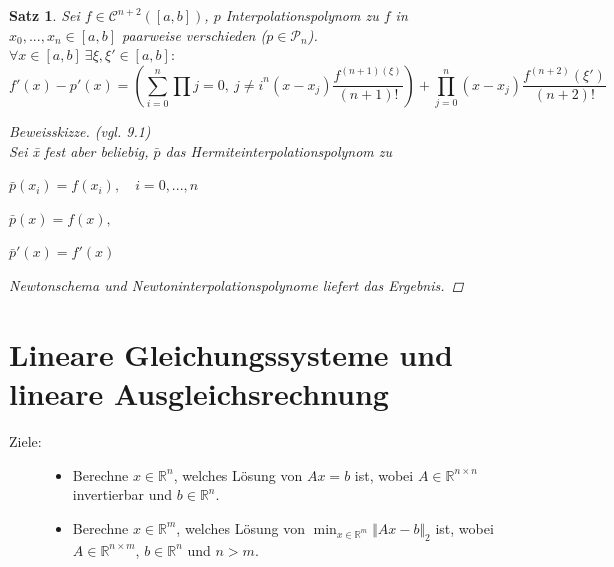 \documentclass[12pt]{article}
\theoremstyle{break}
\newtheorem{theorem}{Satz}[subsection]
\begin{document}
\begin{theorem}
Sei $f \in \mathcal{C}^{n+2}([a,b])$, $p$ Interpolationspolynom zu $f$ in $x_0,..., x_n \in [a,b]$ paarweise verschieden ($p\in \mathcal{P}_n$). \\
$\forall x \in [a,b] \medspace \exists \xi, \xi' \in [a,b]:$ 
$$f'(x) - p'(x) = \left( \sum_{i=0}^n \prod{j=0, \medspace j \neq i}^n (x-x_j) \frac{f^{(n+1)(\xi)}}{(n+1)!}\right) + \prod_{j=0}^n (x-x_j) \frac{f^{(n+2)}(\xi')}{(n+2)!}$$
\begin{proof}[Beweisskizze] (vgl. 9.1) \\
Sei \={x} fest aber beliebig, $\bar{p}$ das Hermiteinterpolationspolynom zu 
\begin{description}
  \item $\bar{p}(x_i) = f(x_i), \quad i=0,...,n$
  \item $\bar{p}(x) = f(x),$
  \item $\bar{p}'(x) = f'(x)$
\end{description}
Newtonschema und Newtoninterpolationspolynome liefert das Ergebnis.
\end{proof}
\end{theorem}

\section{Lineare Gleichungssysteme und lineare Ausgleichsrechnung}
%
\begin{description}
  \item[Ziele:]
    \begin{itemize}
      \item Berechne $x \in \mathbb{R}^n$, welches Lösung von $Ax = b$ ist, wobei $A \in \mathbb{R}^{n\times n}$ invertierbar und $b \in \mathbb{R}^n$.
      \item Berechne $x \in \mathbb{R}^m$, welches Lösung von $\min_{x\in \mathbb{R}^m} \Vert Ax - b \Vert _2$ ist, wobei $A \in \mathbb{R}^{n\times m}$, $b \in \mathbb{R}^n$ und $n>m$.
    \end{itemize}
\end{description}
\end{document}
